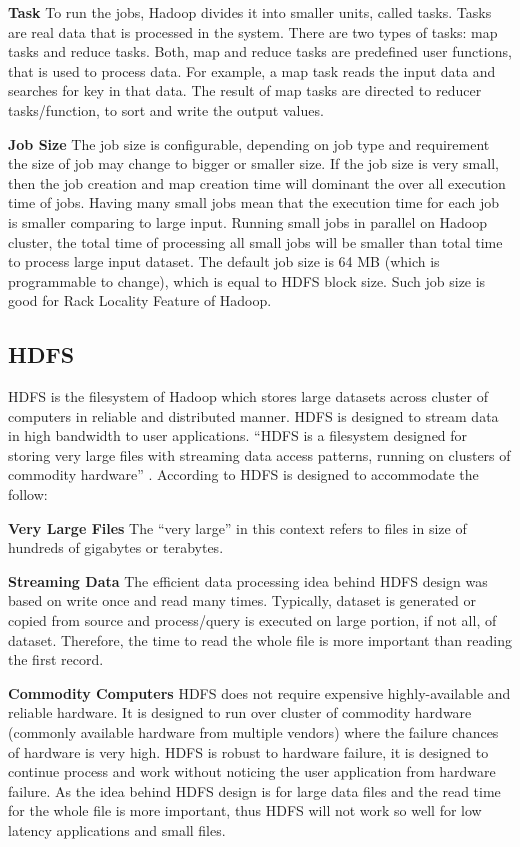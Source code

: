 \textbf{Task}‌ To run the jobs, Hadoop divides it into smaller units, called tasks. Tasks are real data that is processed in the system. There are two types of tasks: map tasks and reduce tasks. Both, map and reduce tasks are predefined user functions, that is used to process data. For example, a map task reads the input data and searches for key in that data. The result of map tasks are directed to reducer tasks/function, to sort and write the output values. 

\textbf{Job Size} The job size is configurable, depending on job type and requirement the size of job may change to bigger or smaller size. If the job size is very small, then the job creation and map creation time will dominant the over all execution time of jobs. Having many small jobs mean that the execution time for each job is smaller comparing to large input. Running small jobs in parallel on Hadoop cluster, the total time of processing all small jobs will be smaller than total time to process large input dataset. The default job size is 64 MB (which is programmable to change), which is equal to HDFS block size. Such job size is good for Rack Locality Feature of Hadoop.\\ 


\subsection{HDFS}


 HDFS is the filesystem of Hadoop which stores large datasets across cluster of computers in reliable and distributed manner. HDFS is designed to stream data in high bandwidth to user applications.
“HDFS is a filesystem designed for storing very large files with streaming data access patterns, running on clusters of commodity hardware” \cite{tom3}. According to \cite{tom3} HDFS‌ is designed to accommodate the follow:

\textbf{Very Large Files } The “very large” in this context refers to files in size of hundreds of gigabytes or terabytes.

\textbf{Streaming Data} The efficient data processing idea behind HDFS design was based on write once and read many times. Typically, dataset is generated or copied from source and process/query is executed on large portion, if not all, of dataset. Therefore, the time to read the whole file is more important than reading the first record. 
  
\textbf{Commodity Computers } HDFS does not require expensive highly-available and reliable hardware. It is designed to run over cluster of commodity hardware (commonly available hardware from multiple vendors) where the  failure chances of hardware is very high. HDFS‌ is robust to hardware failure, it is designed to continue process and work without noticing the user application from hardware failure. As the idea behind HDFS design is for large data files and the read time for the whole file is more important, thus HDFS will not work so well for low latency applications and small files. \\
 
